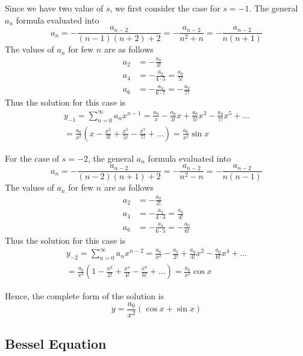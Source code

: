 \documentclass[../../main.tex]{subfiles}
\begin{document}
Since we have two value of $s$, we first consider the case for $s=-1$. The general $a_n$ formula evaluated into 
\begin{equation*}
  a_n=-\frac{a_{n-2}}{(n-1)(n+2)+2}=-\frac{a_{n-2}}{n^2+n}=-\frac{a_{n-2}}{n(n+1)}
\end{equation*}
The values of $a_n$ for few $n$ are as follows 
\begin{align*}
  a_2&=-\frac{a_0}{3!}\\
  a_4&=-\frac{a_2}{4\cdot 5}=\frac{a_0}{5!}\\
  a_6&=-\frac{a_4}{6\cdot7}=-\frac{a_0}{7!}
\end{align*}
Thus the solution for this case is 
\begin{multline*}
  y_{-1}=\sum_{n=0}^{\infty} a_nx^{n-1}=\frac{a_0}{x}-\frac{a_0}{3!}x+\frac{a_0}{5!}x^3-\frac{a_0}{7!}x^5 +\dots\\
  =\frac{a_0}{x^2}\left(x-\frac{x^3}{3!}+\frac{x^5}{5!}-\frac{x^7}{7!}+\dots\right)=\frac{a_0}{x^2}\sin x
\end{multline*}

For the case of $s=-2$, the general $a_n$ formula evaluated into
\begin{equation*}
  a_n=-\frac{a_{n-2}}{(n-2)(n+1)+2}=-\frac{a_{n-2}}{n^2-n}=-\frac{a_{n-2}}{n(n-1)}
\end{equation*}
The values of $a_n$ for few $n$ are as follows 
\begin{align*}
  a_2&=-\frac{a_0}{2!}\\
  a_4&=-\frac{a_2}{4\cdot 3}=\frac{a_0}{4!}\\
  a_6&=-\frac{a_4}{6\cdot 5}=-\frac{a_0}{6!}
\end{align*}
Thus the solution for this case is 
\begin{multline*}
  y_{-2}=\sum_{n=0}^{\infty} a_nx^{n-2}= \frac{a_0}{x^2}-\frac{a_0}{2!}+\frac{a_0}{4!}x^2-\frac{a_0}{6!}x^4 +\dots\\
  =\frac{a_0}{x^2}\left(1-\frac{x^2}{2!}+\frac{x^4}{4!}-\frac{x^6}{6!}+\dots\right)=\frac{a_0}{x^2}\cos x
\end{multline*}

Hence, the complete form of the solution is 
\begin{equation*}
  y=\frac{a_0}{x^2}\left(\cos x +\sin x\right)
\end{equation*}

\subsection*{Bessel Equation}
\end{document}

